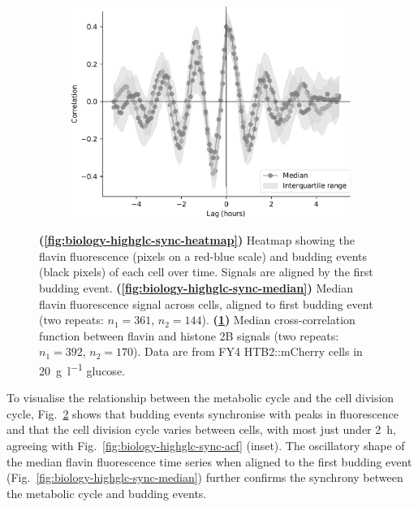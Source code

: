 \begin{figure}
  \begin{subfigure}[htpb]{0.7\textwidth}
   \centering
   \includegraphics[width=\textwidth]{xcf_highglcreps.pdf}
   \caption{
   }
   \label{fig:biology-highglc-sync-xcf}
  \end{subfigure}

  \caption[
    Heatmap showing the flavin fluorescence and budding events of each cell over time.
    Median flavin fluorescence signal across cells, aligned to first budding event.
    Median cross-correlation function between flavin and histone 2B signals.
    Data are from FY4 HTB2::mCherry cells in \SI{20}{\gram~\litre^{-1}} glucose.
  ]{
    \textbf{(\ref{fig:biology-highglc-sync-heatmap})}
    Heatmap showing the flavin fluorescence (pixels on a red-blue scale) and budding events (black pixels) of each cell over time.
    Signals are aligned by the first budding event.
    \textbf{(\ref{fig:biology-highglc-sync-median})}
    Median flavin fluorescence signal across cells, aligned to first budding event (two repeats: $n_{1}=361$, $n_{2}=144$).
    \textbf{(\ref{fig:biology-highglc-sync-xcf})}
    Median cross-correlation function between flavin and histone 2B signals (two repeats: $n_{1}=392$, $n_{2}=170$).
    Data are from FY4 HTB2::mCherry cells in \SI{20}{\gram~\litre^{-1}} glucose.
  }
  \label{fig:biology-highglc-sync-corr}
\end{figure}

To visualise the relationship between the metabolic cycle and the cell division cycle,
Fig.\ \ref{fig:biology-highglc-sync-corr} shows that
budding events synchronise with peaks in fluorescence and
that the cell division cycle varies between cells,
with most just under \SI{2}{\hour}, agreeing with Fig.\ \ref{fig:biology-highglc-sync-acf} (inset).
The oscillatory shape of the median flavin fluorescence time series when aligned to the first budding event (Fig.\ \ref{fig:biology-highglc-sync-median}) further confirms the synchrony between the metabolic cycle and budding events.

